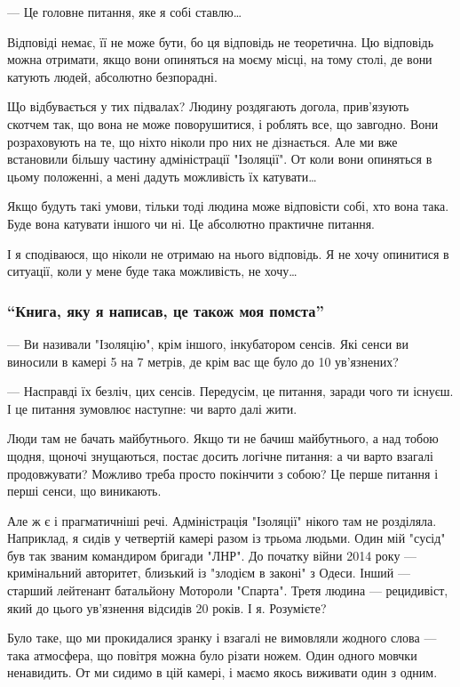 — Це головне питання, яке я собі ставлю…

Відповіді немає, її не може бути, бо ця відповідь не теоретична. Цю відповідь
можна отримати, якщо вони опиняться на моєму місці, на тому столі, де вони
катують людей, абсолютно безпорадні.

Що відбувається у тих підвалах? Людину роздягають догола, прив’язують скотчем
так, що вона не може поворушитися, і роблять все, що завгодно. Вони
розраховують на те, що ніхто ніколи про них не дізнається. Але ми вже
встановили більшу частину адміністрації "Ізоляції". От коли вони опиняться в
цьому положенні, а мені дадуть можливість їх катувати…

Якщо будуть такі умови, тільки тоді людина може відповісти собі, хто вона така.
Буде вона катувати іншого чи ні. Це абсолютно практичне питання.

І я сподіваюся, що ніколи не отримаю на нього відповідь. Я не хочу опинитися в
ситуації, коли у мене буде така можливість, не хочу…

\subsubsection{\enquote{Книга, яку я написав, це також моя помста}}

— Ви називали "Ізоляцію", крім іншого, інкубатором сенсів. Які сенси ви
виносили в камері 5 на 7 метрів, де крім вас ще було до 10 ув'язнених?

— Насправді їх безліч, цих сенсів. Передусім, це питання, заради чого ти
існуєш. І це питання зумовлює наступне: чи варто далі жити.

Люди там не бачать майбутнього. Якщо ти не бачиш майбутнього, а над тобою
щодня, щоночі знущаються, постає досить логічне питання: а чи варто взагалі
продовжувати? Можливо треба просто покінчити з собою? Це перше питання і перші
сенси, що виникають.

Але ж є і прагматичніші речі. Адміністрація "Ізоляції" нікого там не розділяла.
Наприклад, я сидів у четвертій камері разом із трьома людьми. Один мій "сусід"
був так званим командиром бригади "ЛНР". До початку війни 2014 року —
кримінальний авторитет, близький із "злодієм в законі" з Одеси. Інший — старший
лейтенант батальйону Мотороли "Спарта". Третя людина — рецидивіст, який до
цього ув’язнення відсидів 20 років. І я. Розумієте?

Було таке, що ми прокидалися зранку і взагалі не вимовляли жодного слова — така
атмосфера, що повітря можна було різати ножем. Один одного мовчки ненавидить.
От ми сидимо в цій камері, і маємо якось виживати один з одним.

